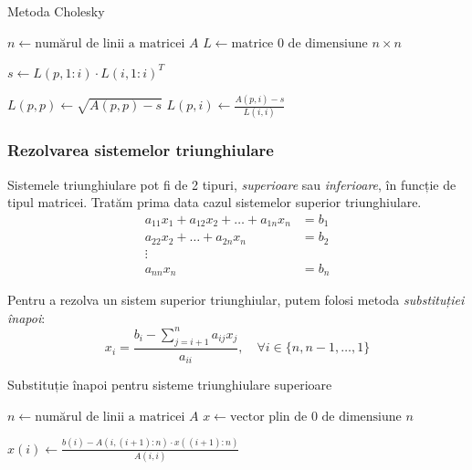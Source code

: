 \documentclass{exam}
\newcommand{\octavescript}[2]{
	
}
\begin{document}

\begin{algorithm}
	\caption{Metoda Cholesky}
	\begin{algorithmic}[1]
		\State \( n \gets \text{numărul de linii a matricei } A \)
		\State \( L \gets \text{matrice 0 de dimensiune } n \times n \)

		\State \( s \gets L(p, 1:i) \cdot L(i, 1:i)^T \)

		\State \( L(p, p) \gets \sqrt{A(p, p) - s} \)
		\Else
		\State \( L(p, i) \gets \frac{A(p, i) - s}{L(i, i)} \)
		\EndIf
		\EndFor
		\EndFor
	\end{algorithmic}
\end{algorithm}

\subsubsection{Rezolvarea sistemelor triunghiulare}

\par Sistemele triunghiulare pot fi de 2 tipuri, \textit{superioare} sau
\textit{inferioare}, în funcție de tipul matricei. Tratăm prima data cazul
sistemelor superior triunghiulare.
\begin{align*}
	a_{11} x_1 + a_{12} x_2 + \ldots + a_{1n} x_n & = b_1 \\
	a_{22} x_2 + \ldots + a_{2n} x_n              & = b_2 \\
	\vdots                                                \\
	a_{nn} x_n                                    & = b_n
\end{align*}

\par Pentru a rezolva un sistem superior triunghiular, putem folosi metoda
\textit{substituției înapoi}:
\begin{equation}
	x_i = \frac{b_i - \sum_{j = i + 1}^{n}{a_{ij} x_j}}{a_{ii}}, \quad \forall i \in \{n, n - 1, \ldots, 1\}
\end{equation}


\begin{algorithm}
	\caption{Substituție înapoi pentru sisteme triunghiulare superioare}
	\begin{algorithmic}[1]
		\State \( n \gets \text{numărul de linii a matricei } A \)
		\State \( x \gets \text{vector plin de 0 de dimensiune } n \)

		\State \( x(i) \gets \frac{b(i) - A(i, (i+1):n) \cdot x((i+1):n)}{A(i, i)} \)
		\EndFor
	\end{algorithmic}
\end{algorithm}
\end{document}
